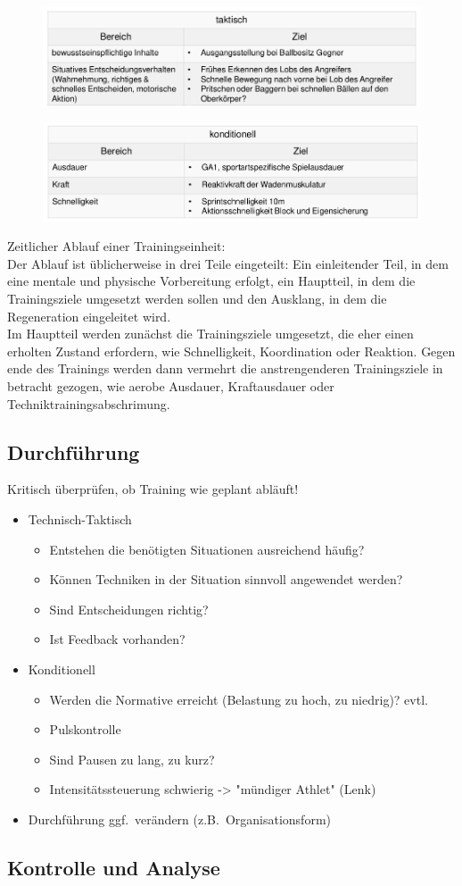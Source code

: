 \begin{figure}[H]
  \centering
  \includegraphics[width=.7\textwidth]{pictures/trainingssteuerung_zieldefinition_taktisch.png}
\end{figure}
\begin{figure}[H]
  \centering
  \includegraphics[width=.7\textwidth]{pictures/trainingssteuerung_zieldefinition_konditionell.png}
\end{figure}
Zeitlicher Ablauf einer Trainingseinheit:\\
Der Ablauf ist üblicherweise in drei Teile eingeteilt: Ein einleitender Teil, in dem eine mentale und physische Vorbereitung erfolgt, ein Hauptteil, in dem die Trainingsziele umgesetzt werden sollen und den Ausklang, in dem die Regeneration eingeleitet wird.\\
Im Hauptteil werden zunächst die Trainingsziele umgesetzt, die eher einen erholten Zustand erfordern, wie Schnelligkeit, Koordination oder Reaktion.
Gegen ende des Trainings werden dann vermehrt die anstrengenderen Trainingsziele in betracht gezogen, wie aerobe Ausdauer, Kraftausdauer oder Techniktrainingsabschrimung.

\subsection{Durchführung}
Kritisch überprüfen, ob Training wie geplant abläuft!
\begin{itemize}
  \item Technisch-Taktisch
    \begin{itemize}
      \item Entstehen die benötigten Situationen ausreichend häufig?
      \item Können Techniken in der Situation sinnvoll angewendet werden?
      \item Sind Entscheidungen richtig?
      \item Ist Feedback vorhanden?
    \end{itemize}
  \item Konditionell
    \begin{itemize}
      \item Werden die Normative erreicht (Belastung zu hoch, zu niedrig)? evtl.
      \item Pulskontrolle
      \item Sind Pausen zu lang, zu kurz?
      \item Intensitätssteuerung schwierig -> "mündiger Athlet" (Lenk)
    \end{itemize}
  \item Durchführung ggf.\ verändern (z.B.\ Organisationsform)
\end{itemize}

\subsection{Kontrolle und Analyse}
